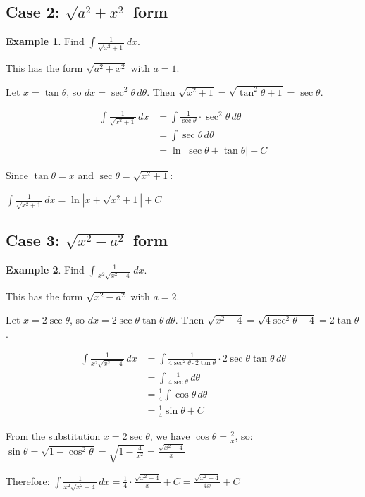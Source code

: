 \documentclass[12pt,a4paper]{book}
\theoremstyle{definition}
\newtheorem{example}{Example}[chapter]
\begin{document}
\subsection{Case 2: $\sqrt{a^2 + x^2}$ form}

\begin{example}
Find $\int \frac{1}{\sqrt{x^2 + 1}} \, dx$.

This has the form $\sqrt{a^2 + x^2}$ with $a = 1$.

Let $x = \tan\theta$, so $dx = \sec^2\theta \, d\theta$.
Then $\sqrt{x^2 + 1} = \sqrt{\tan^2\theta + 1} = \sec\theta$.

\begin{align}
\int \frac{1}{\sqrt{x^2 + 1}} \, dx &= \int \frac{1}{\sec\theta} \cdot \sec^2\theta \, d\theta\\
&= \int \sec\theta \, d\theta\\
&= \ln|\sec\theta + \tan\theta| + C
\end{align}

Since $\tan\theta = x$ and $\sec\theta = \sqrt{x^2 + 1}$:

$\int \frac{1}{\sqrt{x^2 + 1}} \, dx = \ln|x + \sqrt{x^2 + 1}| + C$
\end{example}

\subsection{Case 3: $\sqrt{x^2 - a^2}$ form}

\begin{example}
Find $\int \frac{1}{x^2\sqrt{x^2 - 4}} \, dx$.

This has the form $\sqrt{x^2 - a^2}$ with $a = 2$.

Let $x = 2\sec\theta$, so $dx = 2\sec\theta\tan\theta \, d\theta$.
Then $\sqrt{x^2 - 4} = \sqrt{4\sec^2\theta - 4} = 2\tan\theta$.

\begin{align}
\int \frac{1}{x^2\sqrt{x^2 - 4}} \, dx &= \int \frac{1}{4\sec^2\theta \cdot 2\tan\theta} \cdot 2\sec\theta\tan\theta \, d\theta\\
&= \int \frac{1}{4\sec\theta} \, d\theta\\
&= \frac{1}{4}\int \cos\theta \, d\theta\\
&= \frac{1}{4}\sin\theta + C
\end{align}

From the substitution $x = 2\sec\theta$, we have $\cos\theta = \frac{2}{x}$, so:
$\sin\theta = \sqrt{1 - \cos^2\theta} = \sqrt{1 - \frac{4}{x^2}} = \frac{\sqrt{x^2-4}}{x}$

Therefore: $\int \frac{1}{x^2\sqrt{x^2 - 4}} \, dx = \frac{1}{4} \cdot \frac{\sqrt{x^2-4}}{x} + C = \frac{\sqrt{x^2-4}}{4x} + C$
\end{example}
\end{document}
